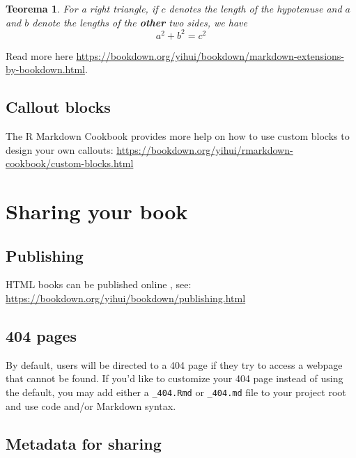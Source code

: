 \documentclass[
  12pt,
]{book}
\newtheorem{theorem}{Teorema}[chapter]
\theoremstyle{definition}
\theoremstyle{definition}
\theoremstyle{definition}
\theoremstyle{definition}
\theoremstyle{remark}
\begin{document}
\begin{theorem}
\protect\hypertarget{thm:tri}{}\label{thm:tri}For a right triangle, if \(c\) denotes the \emph{length} of the hypotenuse
and \(a\) and \(b\) denote the lengths of the \textbf{other} two sides, we have
\[a^2 + b^2 = c^2\]
\end{theorem}

Read more here \url{https://bookdown.org/yihui/bookdown/markdown-extensions-by-bookdown.html}.

\hypertarget{callout-blocks}{%
\section{Callout blocks}\label{callout-blocks}}

The R Markdown Cookbook provides more help on how to use custom blocks to design your own callouts: \url{https://bookdown.org/yihui/rmarkdown-cookbook/custom-blocks.html}

\hypertarget{sharing-your-book}{%
\chapter{Sharing your book}\label{sharing-your-book}}

\hypertarget{publishing}{%
\section{Publishing}\label{publishing}}

HTML books can be published online , see: \url{https://bookdown.org/yihui/bookdown/publishing.html}

\hypertarget{pages}{%
\section{404 pages}\label{pages}}

By default, users will be directed to a 404 page if they try to access a webpage that cannot be found. If you'd like to customize your 404 page instead of using the default, you may add either a \texttt{\_404.Rmd} or \texttt{\_404.md} file to your project root and use code and/or Markdown syntax.

\hypertarget{metadata-for-sharing}{%
\section{Metadata for sharing}\label{metadata-for-sharing}}
\end{document}
